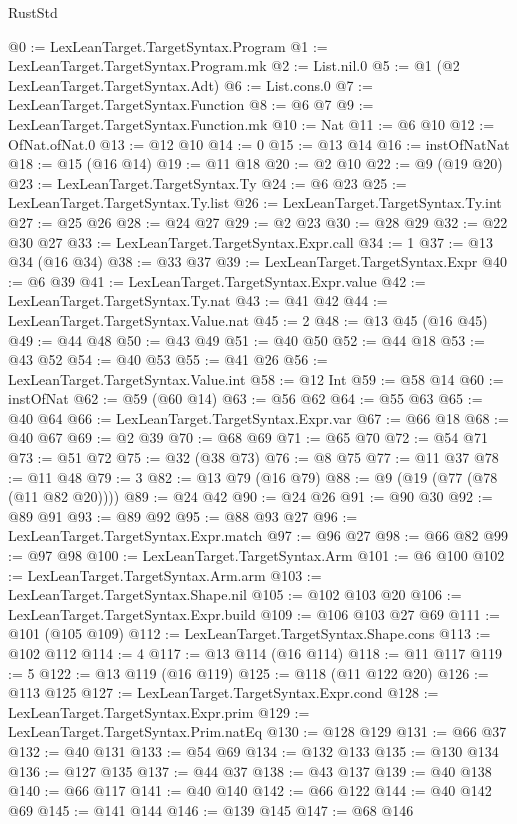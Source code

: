 \begin{lexlean}{RustStd}
\begin{coremodule}
@0 := LexLeanTarget.TargetSyntax.Program
@1 := LexLeanTarget.TargetSyntax.Program.mk
@2 := List.nil.{0}
@5 := @1 (@2 LexLeanTarget.TargetSyntax.Adt)
@6 := List.cons.{0}
@7 := LexLeanTarget.TargetSyntax.Function
@8 := @6 @7
@9 := LexLeanTarget.TargetSyntax.Function.mk
@10 := Nat
@11 := @6 @10
@12 := OfNat.ofNat.{0}
@13 := @12 @10
@14 := 0
@15 := @13 @14
@16 := instOfNatNat
@18 := @15 (@16 @14)
@19 := @11 @18
@20 := @2 @10
@22 := @9 (@19 @20)
@23 := LexLeanTarget.TargetSyntax.Ty
@24 := @6 @23
@25 := LexLeanTarget.TargetSyntax.Ty.list
@26 := LexLeanTarget.TargetSyntax.Ty.int
@27 := @25 @26
@28 := @24 @27
@29 := @2 @23
@30 := @28 @29
@32 := @22 @30 @27
@33 := LexLeanTarget.TargetSyntax.Expr.call
@34 := 1
@37 := @13 @34 (@16 @34)
@38 := @33 @37
@39 := LexLeanTarget.TargetSyntax.Expr
@40 := @6 @39
@41 := LexLeanTarget.TargetSyntax.Expr.value
@42 := LexLeanTarget.TargetSyntax.Ty.nat
@43 := @41 @42
@44 := LexLeanTarget.TargetSyntax.Value.nat
@45 := 2
@48 := @13 @45 (@16 @45)
@49 := @44 @48
@50 := @43 @49
@51 := @40 @50
@52 := @44 @18
@53 := @43 @52
@54 := @40 @53
@55 := @41 @26
@56 := LexLeanTarget.TargetSyntax.Value.int
@58 := @12 Int
@59 := @58 @14
@60 := instOfNat
@62 := @59 (@60 @14)
@63 := @56 @62
@64 := @55 @63
@65 := @40 @64
@66 := LexLeanTarget.TargetSyntax.Expr.var
@67 := @66 @18
@68 := @40 @67
@69 := @2 @39
@70 := @68 @69
@71 := @65 @70
@72 := @54 @71
@73 := @51 @72
@75 := @32 (@38 @73)
@76 := @8 @75
@77 := @11 @37
@78 := @11 @48
@79 := 3
@82 := @13 @79 (@16 @79)
@88 := @9 (@19 (@77 (@78 (@11 @82 @20))))
@89 := @24 @42
@90 := @24 @26
@91 := @90 @30
@92 := @89 @91
@93 := @89 @92
@95 := @88 @93 @27
@96 := LexLeanTarget.TargetSyntax.Expr.match
@97 := @96 @27
@98 := @66 @82
@99 := @97 @98
@100 := LexLeanTarget.TargetSyntax.Arm
@101 := @6 @100
@102 := LexLeanTarget.TargetSyntax.Arm.arm
@103 := LexLeanTarget.TargetSyntax.Shape.nil
@105 := @102 @103 @20
@106 := LexLeanTarget.TargetSyntax.Expr.build
@109 := @106 @103 @27 @69
@111 := @101 (@105 @109)
@112 := LexLeanTarget.TargetSyntax.Shape.cons
@113 := @102 @112
@114 := 4
@117 := @13 @114 (@16 @114)
@118 := @11 @117
@119 := 5
@122 := @13 @119 (@16 @119)
@125 := @118 (@11 @122 @20)
@126 := @113 @125
@127 := LexLeanTarget.TargetSyntax.Expr.cond
@128 := LexLeanTarget.TargetSyntax.Expr.prim
@129 := LexLeanTarget.TargetSyntax.Prim.natEq
@130 := @128 @129
@131 := @66 @37
@132 := @40 @131
@133 := @54 @69
@134 := @132 @133
@135 := @130 @134
@136 := @127 @135
@137 := @44 @37
@138 := @43 @137
@139 := @40 @138
@140 := @66 @117
@141 := @40 @140
@142 := @66 @122
@144 := @40 @142 @69
@145 := @141 @144
@146 := @139 @145
@147 := @68 @146

\end{coremodule}
\end{lexlean}
